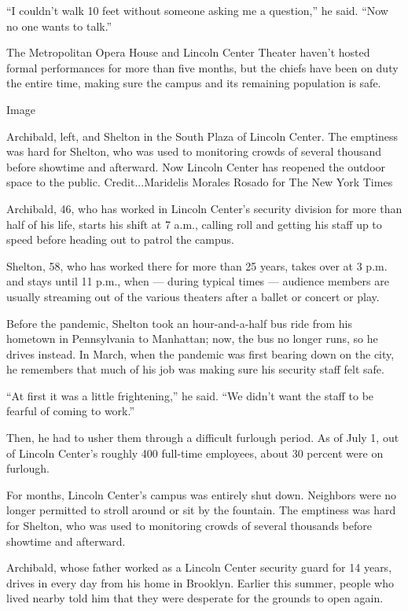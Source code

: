 ``I couldn't walk 10 feet without someone asking me a question,'' he
said. ``Now no one wants to talk.''

The Metropolitan Opera House and Lincoln Center Theater haven't hosted
formal performances for more than five months, but the chiefs have been
on duty the entire time, making sure the campus and its remaining
population is safe.

Image

Archibald, left, and Shelton in the South Plaza of Lincoln Center. The
emptiness was hard for Shelton, who was used to monitoring crowds of
several thousand before showtime and afterward. Now Lincoln Center has
reopened the outdoor space to the public. Credit...Maridelis Morales
Rosado for The New York Times

Archibald, 46, who has worked in Lincoln Center's security division for
more than half of his life, starts his shift at 7 a.m., calling roll and
getting his staff up to speed before heading out to patrol the campus.

Shelton, 58, who has worked there for more than 25 years, takes over at
3 p.m. and stays until 11 p.m., when --- during typical times ---
audience members are usually streaming out of the various theaters after
a ballet or concert or play.

Before the pandemic, Shelton took an hour-and-a-half bus ride from his
hometown in Pennsylvania to Manhattan; now, the bus no longer runs, so
he drives instead. In March, when the pandemic was first bearing down on
the city, he remembers that much of his job was making sure his security
staff felt safe.

``At first it was a little frightening,'' he said. ``We didn't want the
staff to be fearful of coming to work.''

Then, he had to usher them through a difficult furlough period. As of
July 1, out of Lincoln Center's roughly 400 full-time employees, about
30 percent were on furlough.

For months, Lincoln Center's campus was entirely shut down. Neighbors
were no longer permitted to stroll around or sit by the fountain. The
emptiness was hard for Shelton, who was used to monitoring crowds of
several thousands before showtime and afterward.

Archibald, whose father worked as a Lincoln Center security guard for 14
years, drives in every day from his home in Brooklyn. Earlier this
summer, people who lived nearby told him that they were desperate for
the grounds to open again.

